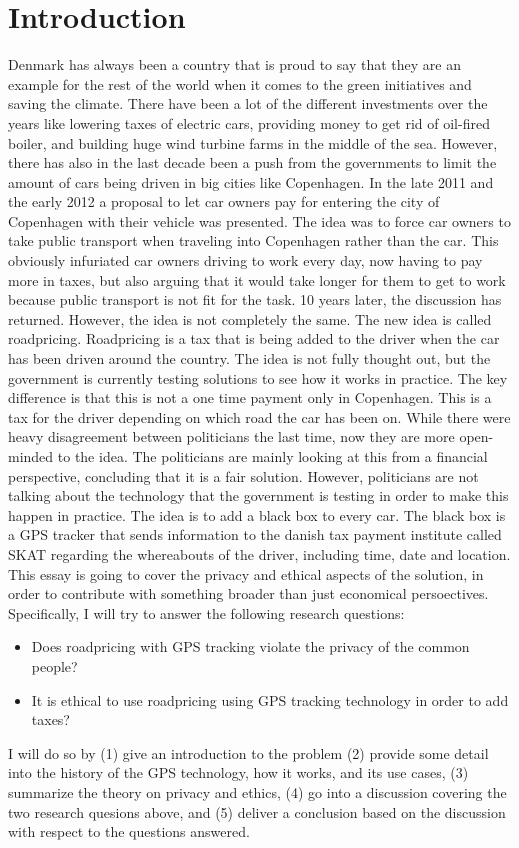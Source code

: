 \section{Introduction}
Denmark has always been a country that is proud to say that they are an example for the rest of the world when it comes to the green initiatives and saving the climate. There have been a lot of the different investments over the years like lowering taxes of electric cars, providing money to get rid of oil-fired boiler, and building huge wind turbine farms in the middle of the sea. However, there has also in the last decade been a push from the governments to limit the amount of cars being driven in big cities like Copenhagen. In the late 2011 and the early 2012 a proposal to let car owners pay for entering the city of Copenhagen with their vehicle was presented. The idea was to  force car owners to take public transport when traveling into Copenhagen rather than the car. This obviously infuriated car owners driving to work every day, now having to pay more in taxes, but also arguing that it would take longer for them to get to work because public transport is not fit for the task. 10 years later, the discussion has returned. However, the idea is not completely the same. The new idea is called roadpricing. Roadpricing is a tax that is being added to the driver when the car has been driven around the country. The idea is not fully thought out, but the government is currently testing solutions to see how it works in practice. The key difference is that this is not a one time payment only in Copenhagen. This is a tax for the driver depending on which road the car has been on. While there were heavy disagreement between politicians the last time, now they are more open-minded to the idea. The politicians are mainly looking at this from a financial perspective, concluding that it is a fair solution. However, politicians are not talking about the technology that the government is testing in order to make this happen in practice. The idea is to add a black box to every car. The black box is a GPS tracker that sends information to the danish tax payment institute called SKAT regarding the whereabouts of the driver, including time, date and location. 
This essay is going to cover the privacy and ethical aspects of the solution, in order to contribute with something broader than just economical persoectives. Specifically, I will try to answer the following research questions:
\begin{itemize}
    \item Does roadpricing with GPS tracking violate the privacy of the common people?
    \item It is ethical to use roadpricing using GPS tracking technology in order to add taxes?
\end{itemize}
I will do so by (1) give an introduction to the problem (2) provide some detail into the history of the GPS technology, how it works, and its use cases, (3) summarize the theory on privacy and ethics, (4) go into a discussion covering the two research quesions above, and (5) deliver a conclusion based on the discussion with respect to the questions answered.